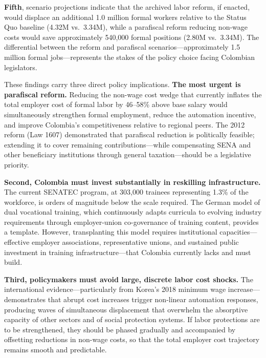 \textbf{Fifth}, scenario projections indicate that the archived labor reform, if enacted, would displace an additional 1.0 million formal workers relative to the Status Quo baseline (4.32M vs.\ 3.34M), while a parafiscal reform reducing non-wage costs would save approximately 540,000 formal positions (2.80M vs.\ 3.34M). The differential between the reform and parafiscal scenarios---approximately 1.5 million formal jobs---represents the stakes of the policy choice facing Colombian legislators.

These findings carry three direct policy implications. \textbf{The most urgent is parafiscal reform.} Reducing the non-wage cost wedge that currently inflates the total employer cost of formal labor by 46--58\% above base salary would simultaneously strengthen formal employment, reduce the automation incentive, and improve Colombia's competitiveness relative to regional peers. The 2012 reform (Law 1607) demonstrated that parafiscal reduction is politically feasible; extending it to cover remaining contributions---while compensating SENA and other beneficiary institutions through general taxation---should be a legislative priority.

\textbf{Second, Colombia must invest substantially in reskilling infrastructure.} The current SENATEC program, at 303,000 trainees representing 1.3\% of the workforce, is orders of magnitude below the scale required. The German model of dual vocational training, which continuously adapts curricula to evolving industry requirements through employer-union co-governance of training content, provides a template. However, transplanting this model requires institutional capacities---effective employer associations, representative unions, and sustained public investment in training infrastructure---that Colombia currently lacks and must build.

\textbf{Third, policymakers must avoid large, discrete labor cost shocks.} The international evidence---particularly from Korea's 2018 minimum wage increase---demonstrates that abrupt cost increases trigger non-linear automation responses, producing waves of simultaneous displacement that overwhelm the absorptive capacity of other sectors and of social protection systems. If labor protections are to be strengthened, they should be phased gradually and accompanied by offsetting reductions in non-wage costs, so that the total employer cost trajectory remains smooth and predictable.

